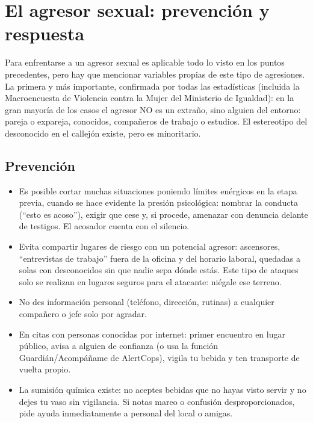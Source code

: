 \chapter{El agresor sexual: prevención y respuesta}

Para enfrentarse a un agresor sexual es aplicable todo lo visto en los puntos precedentes, pero hay que mencionar variables propias de este tipo de agresiones. La primera y más importante, confirmada por todas las estadísticas (incluida la Macroencuesta de Violencia contra la Mujer del Ministerio de Igualdad): en la gran mayoría de los casos el agresor NO es un extraño, sino alguien del entorno: pareja o expareja, conocidos, compañeros de trabajo o estudios. El estereotipo del desconocido en el callejón existe, pero es minoritario.

\section{Prevención}

\begin{itemize}
  \item Es posible cortar muchas situaciones poniendo límites enérgicos en la etapa previa, cuando se hace evidente la presión psicológica: nombrar la conducta (\enquote{esto es acoso}), exigir que cese y, si procede, amenazar con denuncia delante de testigos. El acosador cuenta con el silencio.
  \item Evita compartir lugares de riesgo con un potencial agresor: ascensores, \enquote{entrevistas de trabajo} fuera de la oficina y del horario laboral, quedadas a solas con desconocidos sin que nadie sepa dónde estás. Este tipo de ataques solo se realizan en lugares seguros para el atacante: niégale ese terreno.
  \item No des información personal (teléfono, dirección, rutinas) a cualquier compañero o jefe solo por agradar.
  \item En citas con personas conocidas por internet: primer encuentro en lugar público, avisa a alguien de confianza (o usa la función Guardián/Acompáñame de AlertCops), vigila tu bebida y ten transporte de vuelta propio.
  \item La sumisión química existe: no aceptes bebidas que no hayas visto servir y no dejes tu vaso sin vigilancia. Si notas mareo o confusión desproporcionados, pide ayuda inmediatamente a personal del local o amigas.
\end{itemize}

